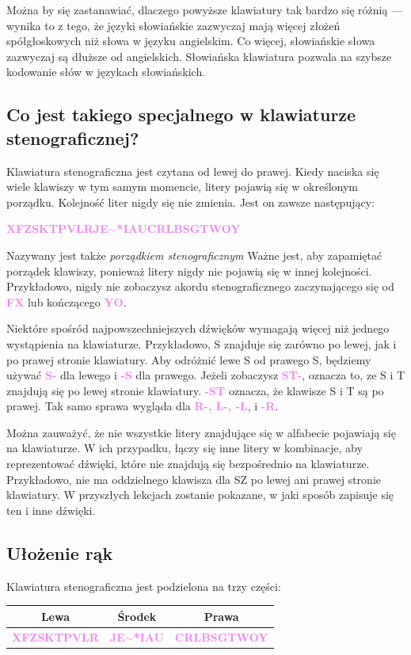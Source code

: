 \documentclass[12p, oneside]{book}
\newcommand{\steno}[1]{\textbf{\textsf{\textcolor{violet}{ #1}}}}
\begin{document}
Można by się zastanawiać, dlaczego powyższe klawiatury tak bardzo się różnią --- wynika to z tego, że języki słowiańskie zazwyczaj mają więcej złożeń spółgłoskowych niż słowa w języku angielskim. Co więcej, słowiańskie słowa zazwyczaj są dłuższe od angielskich. Słowiańska klawiatura pozwala na szybsze kodowanie słów w językach słowiańskich.

\subsection{Co jest takiego specjalnego w klawiaturze stenograficznej?}
Klawiatura stenograficzna jest czytana od lewej do prawej. Kiedy naciska się wiele klawiszy w tym samym momencie, litery pojawią się w określonym porządku. Kolejność liter nigdy się nie zmienia. Jest on zawsze następujący:

\steno{XFZSKTPVLRJE$\sim$*IAUCRLBSGTWOY}

Nazywany jest także \emph{porządkiem stenograficznym} Ważne jest, aby zapamiętać porządek klawiszy, ponieważ litery nigdy nie pojawią się w innej kolejności. Przykładowo, nigdy nie zobaczysz akordu stenograficznego zaczynającego się od \steno{FX} lub kończącego \steno{YO}.

Niektóre spośród najpowszechniejszych dźwięków wymagają więcej niż jednego wystąpienia na klawiaturze. Przykładowo, S znajduje się zarówno po lewej, jak i po prawej stronie klawiatury. Aby odróżnić lewe S od prawego S, będziemy używać \steno{S-} dla lewego i \steno{-S} dla prawego. Jeżeli zobaczysz \steno{ST-}, oznacza to, ze S i T znajdują się po lewej stronie klawiatury. \steno{-ST} oznacza, że klawisze S i T są po prawej. Tak samo sprawa wygląda dla \steno{R-, L-, -L}, i \steno{-R}.

Można zauważyć, że nie wszystkie litery znajdujące się w alfabecie pojawiają się na klawiaturze. W ich przypadku, łączy się inne litery w kombinacje, aby reprezentować dźwięki, które nie znajdują się bezpośrednio na klawiaturze. Przykładowo, nie ma oddzielnego klawisza dla SZ po lewej ani prawej stronie klawiatury. W przyszłych lekcjach zostanie pokazane, w jaki sposób zapisuje się ten i inne dźwięki.

\subsection{Ułożenie rąk}
Klawiatura stenograficzna jest podzielona na trzy części:

\begin{tabular}{c c c}
	\hline
	Lewa & Środek & Prawa \\ \hline
	\steno{XFZSKTPVLR} &  \steno{JE$\sim$*IAU} &  \steno{CRLBSGTWOY} \\ \hline
\end{tabular}
\end{document}
